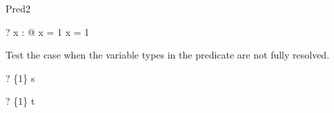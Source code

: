 \begin{zsection}
  \SECTION Pred2
\end{zsection}

\begin{zed}
  \vdash? \exists x : \nat @ x = 1 \lor x = 1
\end{zed}

Test the case when the variable types in the predicate are not fully 
resolved.
\begin{zed} \vdash? \{1\} \in s \end{zed}
\begin{zed} \vdash? \{1\} \in t \end{zed}

